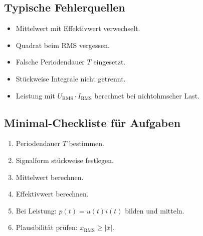 \subsection{Typische Fehlerquellen}

\begin{itemize}
    \item Mittelwert mit Effektivwert verwechselt.
    \item Quadrat beim RMS vergessen.
    \item Falsche Periodendauer $T$ eingesetzt.
    \item Stückweise Integrale nicht getrennt.
    \item Leistung mit $U_{\mathrm{RMS}}\cdot I_{\mathrm{RMS}}$ berechnet bei nichtohmscher Last.
\end{itemize}

\subsection{Minimal-Checkliste für Aufgaben}

\begin{enumerate}
    \item Periodendauer $T$ bestimmen.
    \item Signalform stückweise festlegen.
    \item Mittelwert berechnen.
    \item Effektivwert berechnen.
    \item Bei Leistung: $p(t)=u(t)i(t)$ bilden und mitteln.
    \item Plausibilität prüfen: $x_{\mathrm{RMS}} \ge |\overline{x}|$.
\end{enumerate}
